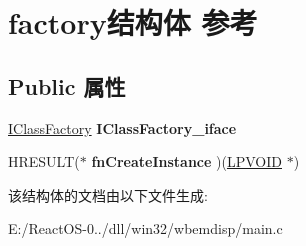 \hypertarget{structfactory}{}\section{factory结构体 参考}
\label{structfactory}
\subsection*{Public 属性}
\begin{DoxyCompactItemize}
\item 
\mbox{\label{structfactory_a38101aaf7cd9cc2cd73f7b6f14cddb8b}} 
\hyperlink{interface_i_class_factory}{I\+Class\+Factory} {\bfseries I\+Class\+Factory\+\_\+iface}
\item 
\mbox{\label{structfactory_a5f8069847db0056d9aa9b2353cf5765d}} 
H\+R\+E\+S\+U\+LT($\ast$ {\bfseries fn\+Create\+Instance} )(\hyperlink{interfacevoid}{L\+P\+V\+O\+ID} $\ast$)
\end{DoxyCompactItemize}


该结构体的文档由以下文件生成\+:\begin{DoxyCompactItemize}
\item 
E\+:/\+React\+O\+S-\/0../dll/win32/wbemdisp/main.\+c\end{DoxyCompactItemize}
